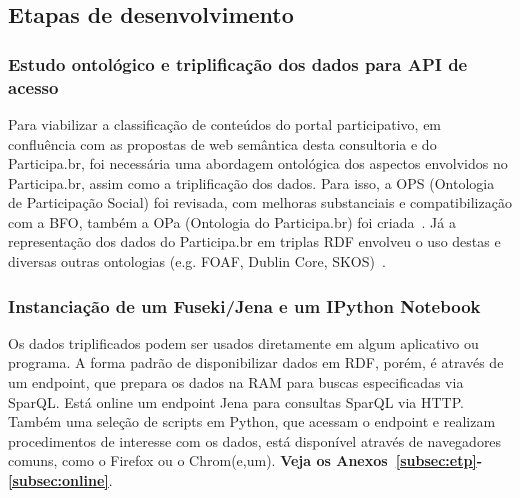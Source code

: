 \documentclass[12pt]{article}
\begin{document}
\subsection{Etapas de desenvolvimento}
\subsubsection{Estudo ontológico e triplificação dos dados para API de acesso}
Para viabilizar a classificação de conteúdos do portal participativo, em confluência com as propostas de web semântica desta consultoria e do Participa.br, foi necessária uma abordagem ontológica dos aspectos envolvidos no Participa.br, assim como a triplificação dos dados. Para isso, a OPS (Ontologia de Participação Social) foi revisada, com melhoras substanciais e compatibilização com a BFO, também a OPa (Ontologia do Participa.br) foi criada~\cite{OPS,OPA}. Já a representação dos dados do Participa.br em triplas RDF envolveu o uso destas e diversas outras ontologias (e.g. FOAF, Dublin Core, SKOS)~\cite{triplifica}.
\subsubsection{Instanciação de um Fuseki/Jena e um IPython Notebook}

Os dados triplificados podem ser usados diretamente em algum aplicativo ou programa. A forma padrão de disponibilizar dados em RDF, porém, é através de um endpoint, que prepara os dados na RAM para buscas especificadas via SparQL. Está online um endpoint Jena para consultas SparQL via HTTP. Também uma seleção de scripts em Python, que acessam o endpoint e realizam procedimentos de interesse com os dados, está disponível através de navegadores comuns, como o Firefox ou o Chrom(e,um). {\bf Veja os Anexos~\ref{subsec:etp}-\ref{subsec:online}}.
\end{document}
